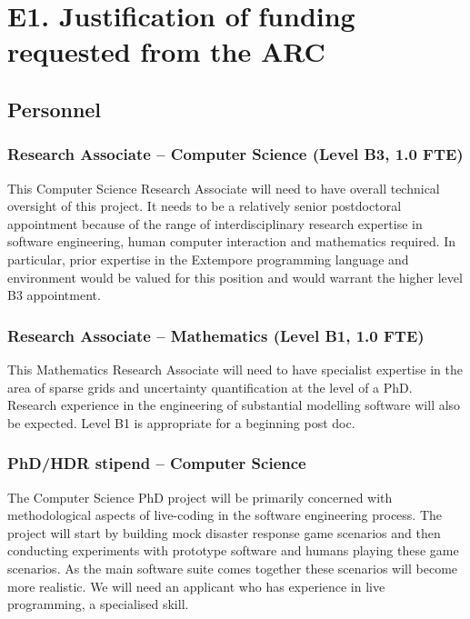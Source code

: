 \documentclass[a4paper,fontsize=12pt]{scrartcl}
\author{}
\date{\today}
\begin{document}
\section*{E1. Justification of funding requested from the ARC}
\label{sec:justificatoin}

\subsection*{Personnel}


\subsubsection*{Research Associate – Computer Science (Level B3, 1.0 FTE)}

This Computer Science Research Associate will need to have overall technical oversight of this project. It needs to be a relatively senior postdoctoral appointment because of the range of interdisciplinary research expertise in software engineering, human computer interaction and mathematics required. In particular, prior expertise in the Extempore programming language and environment would be valued for this position and would warrant the higher level B3 appointment.


\subsubsection*{Research Associate – Mathematics (Level B1, 1.0 FTE)}

This Mathematics Research Associate will need to have specialist expertise in the area of sparse grids and uncertainty quantification at the level of a PhD.  Research experience in the engineering of substantial modelling software will also be expected. Level B1 is appropriate for a beginning post doc. 

\subsubsection*{PhD/HDR stipend – Computer Science}

The Computer Science PhD project will be primarily concerned with methodological aspects of live-coding in the software engineering process. The project will start by building mock disaster response game scenarios and then conducting experiments with prototype software and humans playing these game scenarios. As the main software suite comes together these scenarios will become more realistic. We will need an applicant who has experience in live programming, a specialised skill. 
\end{document}
